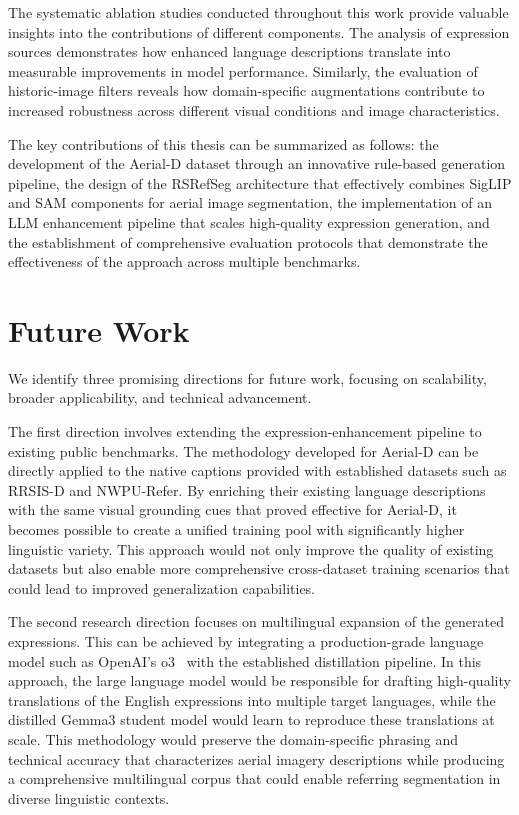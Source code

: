 The systematic ablation studies conducted throughout this work provide valuable insights into the contributions of different components. The analysis of expression sources demonstrates how enhanced language descriptions translate into measurable improvements in model performance. Similarly, the evaluation of historic-image filters reveals how domain-specific augmentations contribute to increased robustness across different visual conditions and image characteristics.

The key contributions of this thesis can be summarized as follows: the development of the Aerial-D dataset through an innovative rule-based generation pipeline, the design of the RSRefSeg architecture that effectively combines SigLIP and SAM components for aerial image segmentation, the implementation of an LLM enhancement pipeline that scales high-quality expression generation, and the establishment of comprehensive evaluation protocols that demonstrate the effectiveness of the approach across multiple benchmarks.

\section{Future Work}

We identify three promising directions for future work, focusing on scalability, broader applicability, and technical advancement.

The first direction involves extending the expression-enhancement pipeline to existing public benchmarks. The methodology developed for Aerial-D can be directly applied to the native captions provided with established datasets such as RRSIS-D and NWPU-Refer. By enriching their existing language descriptions with the same visual grounding cues that proved effective for Aerial-D, it becomes possible to create a unified training pool with significantly higher linguistic variety. This approach would not only improve the quality of existing datasets but also enable more comprehensive cross-dataset training scenarios that could lead to improved generalization capabilities.

The second research direction focuses on multilingual expansion of the generated expressions. This can be achieved by integrating a production-grade language model such as OpenAI's o3~\cite{o3} with the established distillation pipeline. In this approach, the large language model would be responsible for drafting high-quality translations of the English expressions into multiple target languages, while the distilled Gemma3 student model would learn to reproduce these translations at scale. This methodology would preserve the domain-specific phrasing and technical accuracy that characterizes aerial imagery descriptions while producing a comprehensive multilingual corpus that could enable referring segmentation in diverse linguistic contexts.

